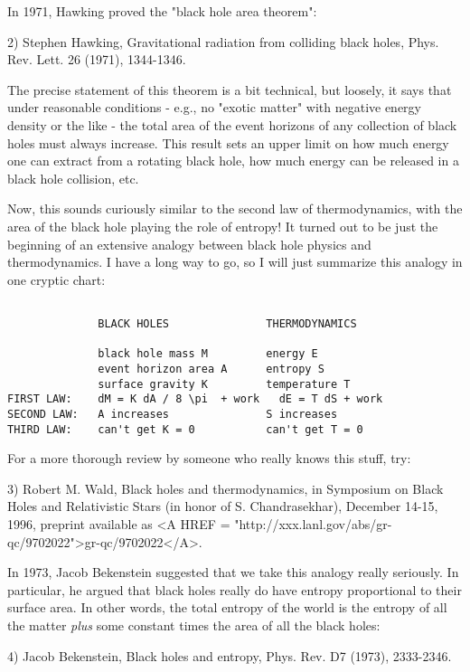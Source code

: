 In 1971, Hawking proved the "black hole area theorem": 

2) Stephen Hawking, Gravitational radiation from colliding black holes,
Phys. Rev. Lett. 26 (1971), 1344-1346.

The precise statement of this theorem is a bit technical, but loosely,
it says that under reasonable conditions - e.g., no "exotic matter"
with negative energy density or the like - the total area of the event
horizons of any collection of black holes must always increase.  This
result sets an upper limit on how much energy one can extract from a
rotating black hole, how much energy can be released in a black hole
collision, etc.

Now, this sounds curiously similar to the second law of thermodynamics,
with the area of the black hole playing the role of entropy!  It turned
out to be just the beginning of an extensive analogy between black hole
physics and thermodynamics.  I have a long way to go, so I will just
summarize this analogy in one cryptic chart:

\begin{verbatim}

              BLACK HOLES               THERMODYNAMICS

              black hole mass M         energy E
              event horizon area A      entropy S
              surface gravity K         temperature T
FIRST LAW:    dM = K dA / 8 \pi  + work   dE = T dS + work
SECOND LAW:   A increases               S increases
THIRD LAW:    can't get K = 0           can't get T = 0

\end{verbatim}
    
For a more thorough review by someone who really knows this stuff, try:

3) Robert M. Wald, Black holes and thermodynamics, in Symposium on
Black Holes and Relativistic Stars (in honor of S. Chandrasekhar), 
December 14-15, 1996, preprint available as <A HREF = "http://xxx.lanl.gov/abs/gr-qc/9702022">gr-qc/9702022</A>.

In 1973, Jacob Bekenstein suggested that we take this analogy really
seriously.  In particular, he argued that black holes really do have
entropy proportional to their surface area.  In other words, the total
entropy of the world is the entropy of all the matter \emph{plus} some
constant times the area of all the black holes:

4) Jacob Bekenstein, Black holes and entropy, Phys. Rev. D7 (1973),
2333-2346.  

